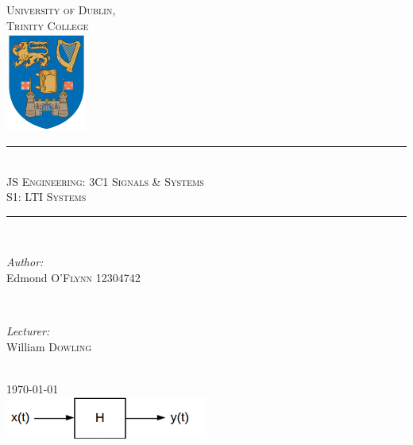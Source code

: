 \documentclass[12pt]{article}
\begin{document}
\begin{titlepage}

\newcommand{\HRule}{\rule{\linewidth}{0.5mm}}

\center
\textsc{\LARGE University of Dublin,\\Trinity College}\\[1.0cm]
\includegraphics[width=0.2\textwidth]{logo.png}

\HRule \\[0.4cm]
\textsc{\Large JS Engineering: 3C1 Signals \& Systems}\\[0.25cm]
\textsc{\large S1: LTI Systems}\\[0.1cm]
\HRule \\[0.4cm]
 
\begin{minipage}{0.5\textwidth}
\begin{flushleft} \large
\emph{Author:}
\\Edmond \textsc{O'Flynn} 12304742
\end{flushleft}
\end{minipage}
~
\begin{minipage}{0.4\textwidth}
\begin{flushleft} 
\large
\emph{Lecturer:} \\
William \textsc{Dowling} 
\end{flushleft}
\end{minipage}\\[6cm]

{\large \today}\\[2cm] 

\includegraphics[width=0.5\textwidth]{lti.png}
\clearpage
\end{titlepage}

\tableofcontents
{}
\thispagestyle{empty}
\cleardoublepage
\setcounter{page}{1}
\end{document}
